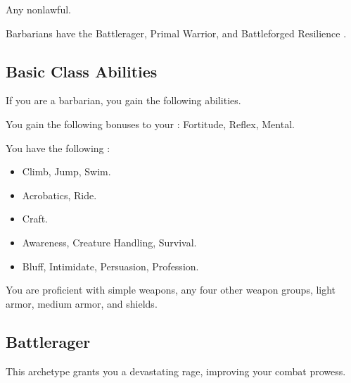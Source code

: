      Any nonlawful.

     Barbarians have the Battlerager, Primal Warrior, and Battleforged Resilience .

    \subsection{Basic Class Abilities}
        If you are a barbarian, you gain the following abilities.

        You gain the following bonuses to your :  Fortitude,  Reflex,  Mental.

        You have the following :
        \begin{itemize}
            \item {} Climb, Jump, Swim.
            \item {} Acrobatics, Ride.
            \item {} Craft.
            \item {} Awareness, Creature Handling, Survival.
            \item {} Bluff, Intimidate, Persuasion, Profession.
        \end{itemize}

        You are proficient with simple weapons, any four other weapon groups, light armor, medium armor, and shields.

    \subsection{Battlerager}\label{Rage}
        This archetype grants you a devastating rage, improving your combat prowess.

